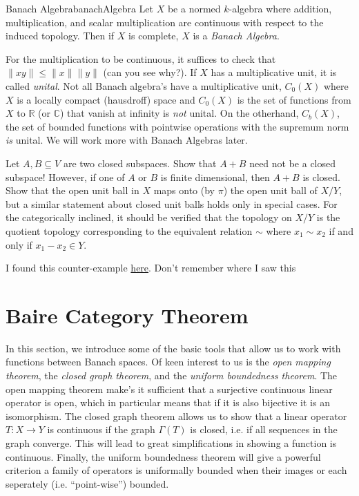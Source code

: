 \documentclass[oneside]{book}
\newcommand{\R}{\mathbb{R}}
\newcommand{\C}{\mathbb{C}}
\newcommand{\sse}{\subseteq}
\begin{document}
\begin{defn}{Banach Algebra}{banachAlgebra}
	Let $X$ be a normed $k$-algebra where addition, multiplication, and scalar multiplication are continuous with
	respect to the induced topology. Then if $X$ is complete, $X$ is a \emph{Banach Algebra}.
\end{defn}

For the multiplication to be continuous, it suffices to check that $\|xy\| \le \|x\|\|y\|$ (can you see why?). If $X$
has a multiplicative unit, it is called \emph{unital}. Not all Banach algebra's have a multiplicative unit, $C_0(X)$
where $X$ is a locally compact (hausdroff) space and $C_0(X)$ is the set of functions from $X$ to $\R$ (or $\C$) that
vanish at infinity is \emph{not} unital. On the otherhand, $C_b(X)$, the set of bounded functions with pointwise
operations with the supremum norm \emph{is} unital. We will work more with Banach Algebras later.

\begin{Exercise}[label=ex:]
  \Question Let $A, B \sse V$ are two closed subspaces. Show that $A + B$ need not be
	a closed subspace! However, if one of $A$ or $B$ is finite dimensional, then $A+B$ is closed.
\Question Show that the open unit ball in $X$ maps onto (by $\pi$) the open unit ball of $X/Y$, but a similar
statement about closed unit balls holds only in special cases.
\Question For the categorically inclined, it should be verified that the  topology on $X/Y$ is the quotient topology
corresponding to the equivalent relation $\sim$ where $x_1\sim x_2$ if and only if $x_1 - x_2 \in Y$.
\end{Exercise}
\begin{Answer}[ref={ex:}]
  \Question I found this counter-example
  \href{https://math.stackexchange.com/questions/1786739/sum-of-closed-spaces-is-not-closed}{here}.
  \Question Don't remember where I saw this
\end{Answer}
\section{Baire Category Theorem}

In this section, we introduce some of the basic tools that allow us to work with functions between Banach spaces. Of
keen interest to us is the \emph{open mapping theorem}, the \emph{closed graph theorem}, and the \emph{uniform
boundedness theorem}. The open mapping theorem make's it sufficient that a surjective continuous linear operator is
open, which in particular means that if it is also bijective it is an isomorphism. The closed graph theorem allows us to
show that a linear operator $T: X \to Y$ is continuous if the graph $\Gamma(T)$ is closed, i.e. if all sequences in the
graph converge. This will lead to great simplifications in showing a function is continuous. Finally, the uniform
boundedness theorem will give a powerful criterion a family of operators is uniformally bounded when their images or
each seperately (i.e. ``point-wise'') bounded.
\end{document}
